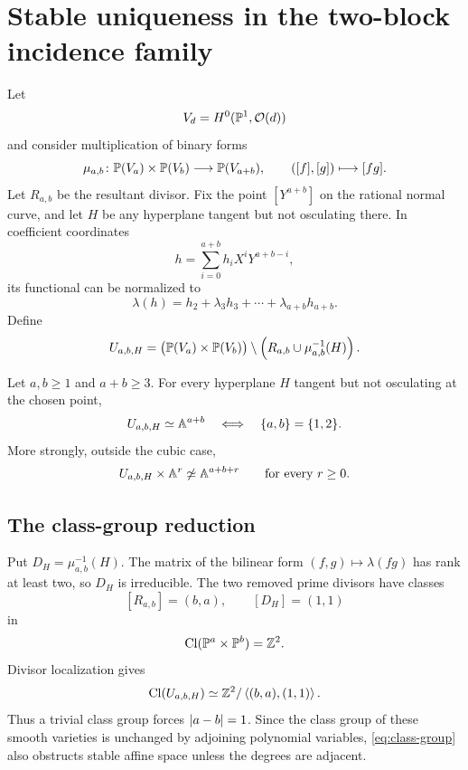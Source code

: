 \documentclass[11pt,reqno]{amsart}
\begin{document}
\section{Stable uniqueness in the two-block incidence family}
\label{sec:stable-uniqueness}

Let
\[
V_d=H^0(\mathbb P^1,\mathcal O(d))
\]
and consider multiplication of binary forms
\[
\mu_{a,b}\colon
\mathbb P(V_a)\times\mathbb P(V_b)\longrightarrow\mathbb P(V_{a+b}),
\qquad ([f],[g])\longmapsto[fg].
\]
Let \(R_{a,b}\) be the resultant divisor.  Fix the point
\([Y^{a+b}]\) on the rational normal curve, and let \(H\) be any hyperplane
tangent but not osculating there.  In coefficient coordinates
\[
h=\sum_{i=0}^{a+b}h_iX^iY^{a+b-i},
\]
its functional can be normalized to
\begin{equation}
\label{eq:tangent-functional}
\lambda(h)=h_2+\lambda_3h_3+\cdots+\lambda_{a+b}h_{a+b}.
\end{equation}
Define
\begin{equation}
\label{eq:Uab}
U_{a,b,H}=
\bigl(\mathbb P(V_a)\times\mathbb P(V_b)\bigr)
\setminus\left(R_{a,b}\cup\mu_{a,b}^{-1}(H)\right).
\end{equation}

\begin{theorem}
\label{thm:stable-uniqueness}
Let \(a,b\ge1\) and \(a+b\ge3\).  For every hyperplane \(H\) tangent but
not osculating at the chosen point,
\[
U_{a,b,H}\simeq\mathbb A^{a+b}
\quad\Longleftrightarrow\quad
\{a,b\}=\{1,2\}.
\]
More strongly, outside the cubic case,
\[
U_{a,b,H}\times\mathbb A^r
\not\simeq\mathbb A^{a+b+r}
\qquad\text{for every }r\ge0.
\]
\end{theorem}

\subsection{The class-group reduction}

Put \(D_H=\mu_{a,b}^{-1}(H)\).  The matrix of the bilinear form
\((f,g)\mapsto\lambda(fg)\) has rank at least two, so \(D_H\) is
irreducible.  The two removed prime divisors have classes
\[
[R_{a,b}]=(b,a),\qquad [D_H]=(1,1)
\]
in
\[
\operatorname{Cl}(\mathbb P^a\times\mathbb P^b)=\mathbb Z^2.
\]
Divisor localization gives
\begin{equation}
\label{eq:class-group}
\operatorname{Cl}(U_{a,b,H})
\simeq\mathbb Z^2/\left\langle(b,a),(1,1)\right\rangle.
\end{equation}
Thus a trivial class group forces \(\left|a-b\right|=1\).  Since the class group
of these smooth varieties is unchanged by adjoining polynomial variables,
\eqref{eq:class-group} also obstructs stable affine space unless the degrees
are adjacent.
\end{document}
